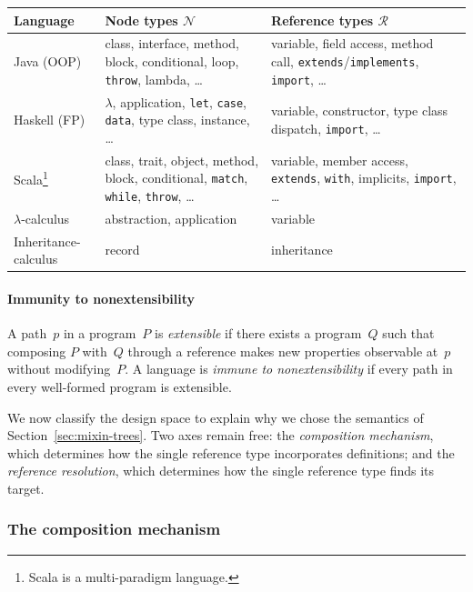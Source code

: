 {\small
  \begin{center}
    \begin{tabular}{lp{}p{}}
      \textbf{Language}
      & \textbf{Node types $\mathcal{N}$}
      & \textbf{Reference types $\mathcal{R}$} \\
      \hline
      Java (OOP)
      & class, interface, method,
      block, conditional, loop,
      \texttt{throw}, lambda, \ldots
      & variable, field access, method call,
      \texttt{extends}/\texttt{implements},
      \texttt{import}, \ldots \\[3pt]
      Haskell (FP)
      & $\lambda$, application, \texttt{let},
      \texttt{case}, \texttt{data},
      type class, instance, \ldots
      & variable, constructor,
      type class dispatch,
      \texttt{import}, \ldots \\[3pt]
      Scala\footnote{
        Scala is a multi-paradigm language.
      }
      & class, trait, object, method,
      block, conditional, \texttt{match},
      \texttt{while}, \texttt{throw}, \ldots
      & variable, member access,
      \texttt{extends}, \texttt{with},
      implicits, \texttt{import}, \ldots \\
      \hline
      $\lambda$-calculus
      & abstraction, application
      & variable \\
      Inheritance-calculus
      & record
      & inheritance \\
    \end{tabular}
  \end{center}
}

\paragraph{Immunity to nonextensibility}
A path~$p$ in a program~$P$ is \emph{extensible} if there exists
a program~$Q$ such that composing $P$ with~$Q$ through a reference
makes new properties observable at~$p$ without modifying~$P$.
A language is \emph{immune to nonextensibility} if every path in
every well-formed program is extensible.

We now classify the design space to explain why we chose the
semantics of Section~\ref{sec:mixin-trees}.
Two axes remain free:
the \emph{composition mechanism}, which determines how the single reference
type incorporates definitions;
and the \emph{reference resolution}, which determines how the single reference
type finds its target.

\subsubsection*{The composition mechanism}

